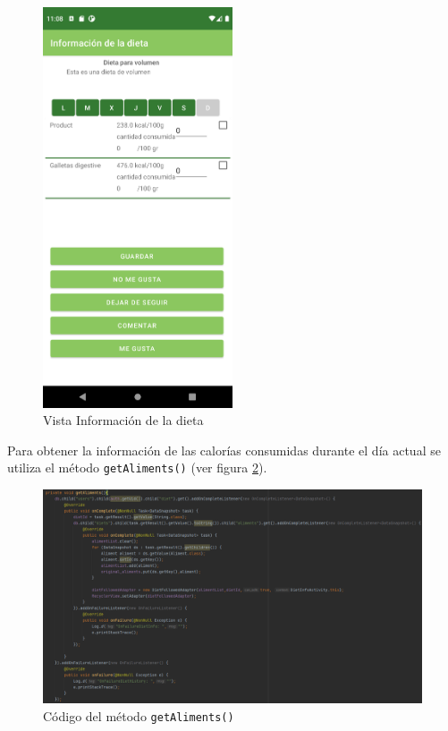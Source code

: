 \begin{figure}[H]
    \centering
    \includegraphics[width=0.5\textwidth]{Images/Capitulo7/infodieta.png}
    \caption{Vista Información de la dieta}
    \label{fig:infodieta}
\end{figure}

Para obtener la información de las calorías consumidas durante el día actual se utiliza el método \texttt{getAliments()} (ver figura \ref{fig:getaliments}).

\begin{figure}[H]
    \centering
    \includegraphics[width=\textwidth]{Images/Capitulo7/getaliments.png}
    \caption{Código del método \texttt{getAliments()}}
    \label{fig:getaliments}
\end{figure}

